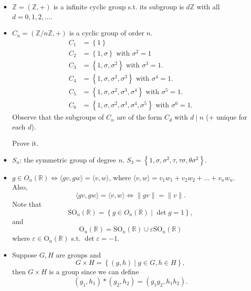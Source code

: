 \begin{prev}
    \vphantom{text}
    \begin{itemize}
        \item \(\mathbb{Z} = (\mathbb{Z} , +)\) is a infinite cyclic group s.t. its subgroup is \(d \mathbb{Z} \) with all \(d = 0, 1, 2, \dots \). 
        \item \(C_n = (\mathbb{Z} / n \mathbb{Z} , +)\) is a cyclic group of order \(n\).
        \begin{align*}
            C_1 &= \left\{ 1 \right\} \\
            C_2 &= \left\{ 1, \sigma  \right\} \text{ with } \sigma ^2 = 1 \\
            C_3 &= \left\{ 1, \sigma , \sigma ^2 \right\} \text{ with } \sigma ^3 = 1.  \\
            C_4 &= \left\{ 1, \sigma , \sigma ^2, \sigma ^3 \right\} \text{ with } \sigma ^4 = 1. \\
            C_5 &= \left\{ 1, \sigma , \sigma ^2, \sigma ^3, \sigma ^4 \right\}  \text{ with } \sigma ^5 = 1. \\
            C_6 &= \left\{ 1, \sigma , \sigma ^2, \sigma ^3, \sigma ^4, \sigma ^5 \right\}  \text{ with } \sigma ^6 = 1. 
        \end{align*}
            Observe that the subgroups of \(C_n\) are of the form \(C_d\) with \(d \mid n\) (\(+\) unique for each \(d\)).
    \begin{exercise}
    Prove it.
    \end{exercise}   
    \item \(S_n\): the symmetric group of degree \(n\). \(S_3 = \left\{ 1, \sigma , \sigma ^2, \tau , \tau \sigma , \theta \sigma ^2 \right\} \).  
    \item \(g \in O_n(\mathbb{R} ) \iff \langle gv, gw \rangle = \langle v, w \rangle  \), where \(\langle v,w \rangle = v_1 w_1 + v_2 w_2 + \dots + v_n w_n \). Also,
    \[
        \langle gv ,gw \rangle = \langle v,w \rangle \iff \lVert gv \rVert = \lVert v \rVert.  
    \]
    Note that 
\[
    \mathrm{SO}_n(\mathbb{R}) = \left\{ g \in O_n(\mathbb{R} ) \mid \det g = 1 \right\},  
\] and 
\[
    \mathrm{O} _n(\mathbb{R} ) = \mathrm{SO}_n(\mathbb{R} ) \cup \varepsilon  \mathrm{SO}_n(\mathbb{R} )  
\]where \(\varepsilon \in \mathrm{O}_n(\mathbb{R} ) \) s.t. \(\det \varepsilon = -1\).  
    \item Suppose \(G, H\) are groups and 
    \[
        G \times H = \left\{ (g, h) \mid g \in G, h \in H \right\}, 
    \] then \(G \times H\) is a group since we can define 
    \[
        (g_1, h_1) * (g_2, h_2) = (g_1 g_2, h_1 h_2).
    \]

    \end{itemize}
\end{prev}

